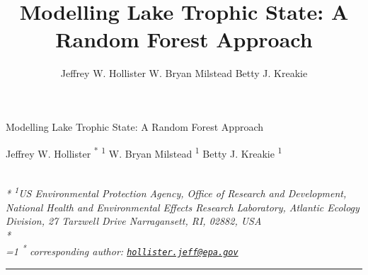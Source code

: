 \documentclass[12pt,]{article}
\title{Modelling Lake Trophic State: A Random Forest Approach}
\author{
Jeffrey W. Hollister
W. Bryan Milstead
Betty J. Kreakie
}
\date{}
\begin{document}
\begin{singlespace}
\begin{center}
\huge Modelling Lake Trophic State: A Random Forest Approach
\end{center}
\begin{center}
\large
Jeffrey W. Hollister \textsuperscript{*} \textsuperscript{1} 
W. Bryan Milstead \textsuperscript{1} 
Betty J. Kreakie \textsuperscript{1} 
\end{center}
\begin{justify}
\footnotesize \emph{ 
\\*
\textsuperscript{1}US Environmental Protection Agency, Office of Research and Development,
National Health and Environmental Effects Research Laboratory, Atlantic
Ecology Division, 27 Tarzwell Drive Narragansett, RI, 02882, USA\\*
}
\setcounter{num}{1}
\\[0.1cm]
\footnotesize \emph{ 
\ifnum\value{num}=1%
\textsuperscript{*} corresponding author:
\fi
\href{mailto:hollister.jeff@epa.gov}{\nolinkurl{hollister.jeff@epa.gov}}
}
\end{justify}
\normalsize

\end{singlespace}


\singlespace

\vspace{2mm}

\hrule
\end{document}
